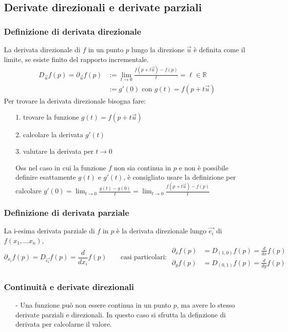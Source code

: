 \documentclass[a4paper]{article}
\newcommand\R{\mathbb{R}}     %
\newcommand\dx{\frac{d}{dx}}  %
\newcommand\dy{\frac{d}{dy}}  %
\begin{document}
\subsection{Derivate direzionali e derivate parziali}
\subsubsection*{Definizione di derivata direzionale}
La derivata direzionale di \(f\) in un punto \(p\) lungo la direzione \(\vec{u}\) è definita come il limite, se esiste finito
del rapporto incrementale.
\begin{align*}
	D_{\vec{u}} f(p) = \partial_{\vec{u}} f(p) &:= \lim_{t \to 0} \frac{f(p + t \vec{u}) - f(p)}{t} = \ell \in \R \\
	&:= g'(0) \text{ con } g(t) = f(p + t\vec{u})
\end{align*}
Per trovare la derivata direzionale bisogna fare:
\begin{itemize}[topsep=3pt, itemsep=0pt]
	\item[1.] trovare la funzione \(g(t) = f(p+t\vec{u})\)
	\item[2.] calcolare la derivata \(g'(t)\)
	\item[3.] valutare la derivata per \(t \to 0\)
	\item[Oss] nel caso in cui la funzione \(f\) non sia continua in \(p\) e non è possibile definire esattamente \(g(t)\) e \(g'(t)\),
	è consigliato usare la definizione per calcolare \(\displaystyle g'(0) = \lim_{t \to 0} \frac{g(t) - g(0)}{t} = \lim_{t \to 0} \frac{f(p + t \vec{u}) - f(p)}{t}\)
\end{itemize}

\subsubsection*{Definizione di derivata parziale}
La i-esima derivata parziale di \(f\) in \(p\) è la derivata direzionale lungo \(\vec{e_i}\) di \(f(x_1, \dots x_n)\),
\[\partial_{x_i} f(p) = D_{\vec{e_i}} f(p) = \frac{d}{d x_i} f(p) \qquad \text{casi particolari: } \begin{aligned}
	\partial_x f(p) &= D_{(1,0)} f(p) = \dx f(p) \\
	\partial_y f(p) &= D_{(0,1)} f(p) = \dy f(p)
\end{aligned}\]

\subsubsection*{Continuità e derivate direzionali}
\begin{itemize}[topsep=3pt, itemsep=0pt]
	\item[-] Una funzione può non essere continua in un punto \(p\), ma avere lo stesso derivate parziali e direzionali. In questo
	caso si sfrutta la definzione di derivata per calcolarne il valore.
\end{itemize}
\end{document}
